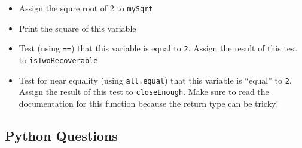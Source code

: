\documentclass[12pt,krantz2]{krantz}
\providecommand{\tightlist}{%
  \setlength{\itemsep}{0pt}\setlength{\parskip}{0pt}}
\begin{document}
\begin{enumerate}
  \begin{itemize}
  \tightlist
  \item
    Assign the squre root of 2 to \texttt{mySqrt}
  \item
    Print the square of this variable
  \item
    Test (using \texttt{==}) that this variable is equal to \texttt{2}. Assign the result of this test to \texttt{isTwoRecoverable}
  \item
    Test for near equality (using \texttt{all.equal}) that this variable is ``equal'' to \texttt{2}. Assign the result of this test to \texttt{closeEnough}. Make sure to read the documentation for this function because the return type can be tricky!
  \end{itemize}
\end{enumerate}

\hypertarget{python-questions}{%
\subsection{Python Questions}\label{python-questions}}
\end{document}
